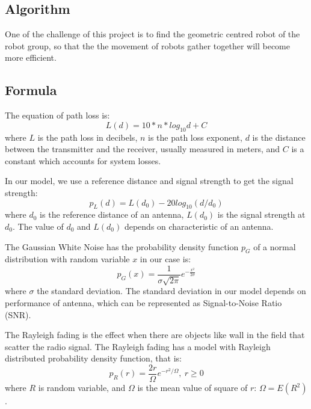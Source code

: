 \subsection{Algorithm}
One of the challenge of this project is to find the geometric centred robot of the robot group, so that the the movement of robots gather together will become more efficient.  

\subsection{Formula}
The equation of path loss is:
\begin{equation}
L(d)=10*n*log_{10}d + C
\end{equation}
where $L$ is the path loss in decibels, $n$ is the path loss exponent, $d$ is the distance between the transmitter and the receiver, usually measured in meters, and $C$ is a constant which accounts for system losses.
\par
In our model, we use a reference distance and signal strength to get the signal strength:
\begin{equation}
p_{L}(d)=L(d_{0})-20log_{10}(d/d_{0})
\end{equation}
where $d_{0}$ is the reference distance of an antenna, $L(d_{0})$ is the signal strength at $d_{0}$. The value of $d_{0}$ and $L(d_{0})$ depends on characteristic of an antenna.
\\
\vspace{1cm}

The Gaussian White Noise has the probability density function $p_{G}$ of a normal distribution with random variable $x$ in our case is:
\begin{equation}
p_{G}(x)={\frac {1}{ {\sigma\sqrt {2\pi }}}}e^{-{\frac {x^{2}}{2\sigma}}}
\end{equation}
where $\sigma$  the standard deviation. The standard deviation in our model depends on performance of antenna, which can be represented as Signal-to-Noise Ratio (SNR).
\vspace{1cm}

The Rayleigh fading is the effect when there are objects like wall in the field that scatter the radio signal. The Rayleigh fading has a model with Rayleigh distributed probability density function, that is:
\begin{equation}
p_{R}(r)={\frac {2r}{\Omega }}e^{-r^{2}/\Omega },\ r\geq {}0
\end{equation}
where $R$ is random variable, and $\Omega$ is the mean value of square of $r$: $\Omega = E(R^{2})$.
\vspace{1cm}

